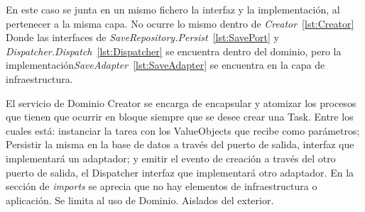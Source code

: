 En este caso se junta en un mismo fichero la interfaz y la implementación, al pertenecer a la misma capa.
No ocurre lo mismo dentro de \textit{Creator}~\cref{lst:Creator} Donde las interfaces de \textit{SaveRepository.Persist}~\cref{lst:SavePort} y \textit{Dispatcher.Dispatch}~\cref{lst:Dispatcher} se encuentra dentro del dominio, pero la implementación\textit{SaveAdapter}~\cref{lst:SaveAdapter} se encuentra en la capa de infraestructura.

El servicio de Dominio Creator se encarga de encapsular y atomizar los procesos que tienen que ocurrir en bloque siempre que se desee crear una Task.
Entre los cuales está: instanciar la tarea con los ValueObjects que recibe como parámetros;
Persistir la misma en la base de datos a través del puerto de salida, interfaz que implementará un adaptador;
y emitir el evento de creación a través del otro puerto de salida, el Dispatcher interfaz que implementará otro adaptador.
En la sección de \textit{imports} se aprecia que no hay elementos de infraestructura o aplicación.
Se limita al uso de Dominio.
Aislados del exterior.








